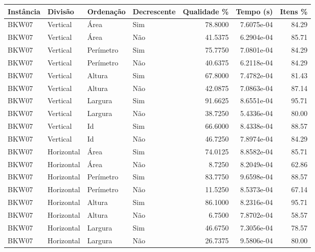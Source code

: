 \begin{tabular}{llllrrr}
    \hline
    Instância & Divisão     & Ordenação & Decrescente & Qualidade \% & Tempo (s)  & Itens \% \\
    \hline
    BKW07     & Vertical    & Área      & Sim         & 78.8000      & 7.6075e-04 & 84.29    \\
    BKW07     & Vertical    & Área      & Não         & 41.5375      & 6.2904e-04 & 85.71    \\
    BKW07     & Vertical    & Perímetro & Sim         & 75.7750      & 7.0801e-04 & 84.29    \\
    BKW07     & Vertical    & Perímetro & Não         & 40.6375      & 6.2118e-04 & 84.29    \\
    BKW07     & Vertical    & Altura    & Sim         & 67.8000      & 7.4782e-04 & 81.43    \\
    BKW07     & Vertical    & Altura    & Não         & 42.0875      & 7.0863e-04 & 87.14    \\
    BKW07     & Vertical    & Largura   & Sim         & 91.6625      & 8.6551e-04 & 95.71    \\
    BKW07     & Vertical    & Largura   & Não         & 38.7250      & 5.4336e-04 & 80.00    \\
    BKW07     & Vertical    & Id        & Sim         & 66.6000      & 8.4338e-04 & 88.57    \\
    BKW07     & Vertical    & Id        & Não         & 46.7250      & 7.8974e-04 & 84.29    \\
    BKW07     & Horizontal  & Área      & Sim         & 74.0125      & 8.8582e-04 & 85.71    \\
    BKW07     & Horizontal  & Área      & Não         & 8.7250       & 8.2049e-04 & 62.86    \\
    BKW07     & Horizontal  & Perímetro & Sim         & 83.7750      & 9.6598e-04 & 88.57    \\
    BKW07     & Horizontal  & Perímetro & Não         & 11.5250      & 8.5373e-04 & 67.14    \\
    BKW07     & Horizontal  & Altura    & Sim         & 86.1000      & 8.2316e-04 & 95.71    \\
    BKW07     & Horizontal  & Altura    & Não         & 6.7500       & 7.8702e-04 & 58.57    \\
    BKW07     & Horizontal  & Largura   & Sim         & 46.6750      & 7.3056e-04 & 78.57    \\
    BKW07     & Horizontal  & Largura   & Não         & 26.7375      & 9.5806e-04 & 80.00    \\

\end{tabular}
